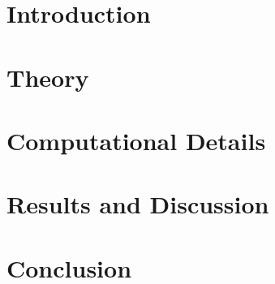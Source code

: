 \documentclass[../main.tex]{subfiles}
\begin{document}
{\clearpage
\pagebreak

\section{Introduction}



\section{Theory}



\section{Computational Details}



\section{Results and Discussion}



\clearpage
\newpage

\section{Conclusion}



}
\end{document}
